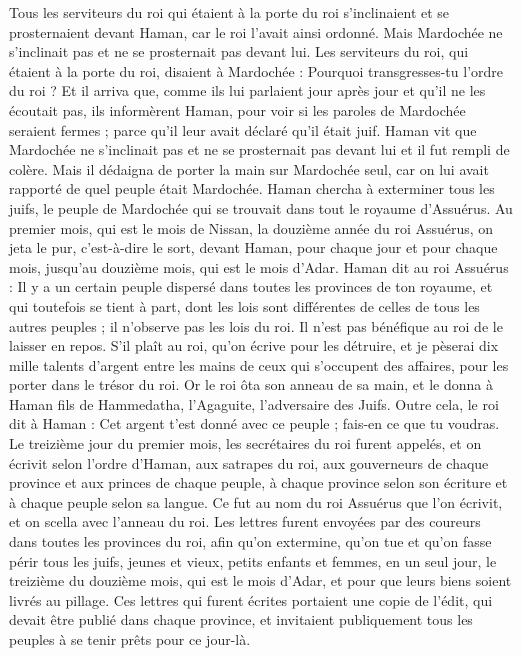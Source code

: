 \begin{multicols}{2}
Tous les serviteurs du roi qui étaient à la porte du roi s'inclinaient et se prosternaient devant Haman, car le roi l’avait ainsi ordonné. Mais Mardochée ne s'inclinait pas et ne se prosternait pas devant lui.
Les serviteurs du roi, qui étaient à la porte du roi, disaient à Mardochée : Pourquoi transgresses-tu l’ordre du roi ?
Et il arriva que, comme ils lui parlaient jour après jour et qu’il ne les écoutait pas, ils informèrent Haman, pour voir si les paroles de Mardochée seraient fermes ; parce qu’il leur avait déclaré qu’il était juif.
Haman vit que Mardochée ne s'inclinait pas et ne se prosternait pas devant lui et il fut rempli de colère.
Mais il dédaigna de porter la main sur Mardochée seul, car on lui avait rapporté de quel peuple était Mardochée. Haman chercha à exterminer tous les juifs, le peuple de Mardochée qui se trouvait dans tout le royaume d'Assuérus.
Au premier mois, qui est le mois de Nissan, la douzième année du roi Assuérus, on jeta le pur, c'est-à-dire le sort, devant Haman, pour chaque jour et pour chaque mois, jusqu’au douzième mois, qui est le mois d'Adar.
Haman dit au roi Assuérus : Il y a un certain peuple dispersé dans toutes les provinces de ton royaume, et qui toutefois se tient à part, dont les lois sont différentes de celles de tous les autres peuples ; il n’observe pas les lois du roi. Il n'est pas bénéfique au roi de le laisser en repos.
S'il plaît au roi, qu'on écrive pour les détruire, et je pèserai dix mille talents d'argent entre les mains de ceux qui s’occupent des affaires, pour les porter dans le trésor du roi.
Or le roi ôta son anneau de sa main, et le donna à Haman fils de Hammedatha, l’Agaguite, l’adversaire des Juifs.
Outre cela, le roi dit à Haman : Cet argent t'est donné avec ce peuple ; fais-en ce que tu voudras.
Le treizième jour du premier mois, les secrétaires du roi furent appelés, et on écrivit selon l’ordre d'Haman, aux satrapes du roi, aux gouverneurs de chaque province et aux princes de chaque peuple, à chaque province selon son écriture et à chaque peuple selon sa langue. Ce fut au nom du roi Assuérus que l’on écrivit, et on scella avec l'anneau du roi.
Les lettres furent envoyées par des coureurs dans toutes les provinces du roi, afin qu'on extermine, qu’on tue et qu’on fasse périr tous les juifs, jeunes et vieux, petits enfants et femmes, en un seul jour, le treizième du douzième mois, qui est le mois d'Adar, et pour que leurs biens soient livrés au pillage.
Ces lettres qui furent écrites portaient une copie de l’édit, qui devait être publié dans chaque province, et invitaient publiquement tous les peuples à se tenir prêts pour ce jour-là.

\end{multicols}
